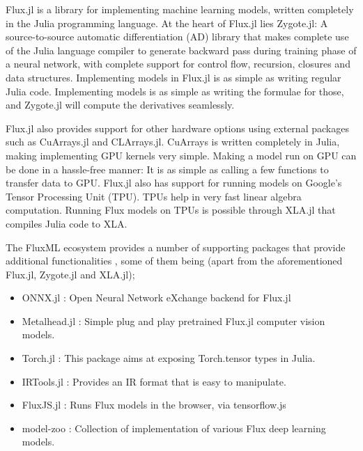 \documentclass{juliacon}
\begin{document}
Flux.jl is a library for implementing machine learning models, written completely in the Julia
programming language. At the heart of Flux.jl lies Zygote.jl: A source-to-source automatic
differentiation (AD) library that makes complete use of the Julia language compiler to generate
backward pass during training phase of a neural network, with complete support for control flow,
recursion, closures and data structures.  
Implementing models in Flux.jl is as simple as writing regular Julia code. Implementing models
is as simple as writing the formulae for those, and Zygote.jl will compute the derivatives 
seamlessly.  

Flux.jl also provides support for other hardware options using external packages such as CuArrays.jl
and CLArrays.jl. CuArrays is written completely in Julia, making implementing GPU kernels very simple.
Making a model run on GPU can be done in a hassle-free manner: It is as simple as calling a few functions
to transfer data to GPU. Flux.jl also has support for running models on Google's Tensor Processing
Unit (TPU). TPUs help in very fast linear algebra computation. Running Flux models on TPUs is possible
through XLA.jl that compiles Julia code to XLA.  

The FluxML ecosystem provides a number of supporting packages that provide additional functionalities , some of them being (apart from the aforementioned Flux.jl, Zygote.jl and XLA.jl);

\begin{itemize}
    \item ONNX.jl : Open Neural Network eXchange backend for Flux.jl
    \item Metalhead.jl \cite{Metalhead.jl}: Simple plug and play pretrained Flux.jl computer vision models.
    \item Torch.jl \cite{Torch.jl}: This package aims at exposing Torch.tensor types in Julia.
    \item IRTools.jl \cite{IRTools.jl} : Provides an IR format that is easy to manipulate.
    \item FluxJS.jl \cite{FluxJS.jl} : Runs Flux models in the browser, via tensorflow.js
    \item model-zoo \cite{model-zoo}: Collection of implementation of various Flux deep learning models.
\end{itemize}
\end{document}
